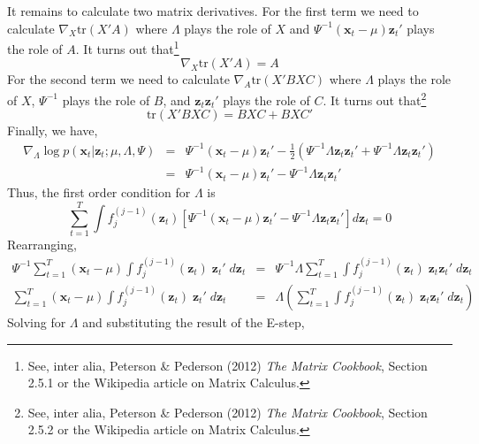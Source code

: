 \documentclass[12pt]{article}
\theoremstyle{definition}
\begin{document}
It remains to calculate two matrix derivatives. For the first term we need to calculate $\nabla_X \mbox{tr}(X'A)$ where $\Lambda$ plays the role of $X$ and $\Psi^{-1}(\mathbf{x}_t - \mu)\mathbf{z}_t'$ plays the role of $A$. It turns out that\footnote{See, inter alia, Peterson \& Pederson (2012) \emph{The Matrix Cookbook}, Section 2.5.1 or the Wikipedia article on Matrix Calculus.} 
	$$\nabla_X \mbox{tr}(X'A)  = A$$
For the second term we need to calculate $\nabla_A \mbox{tr}(X'BXC)$ where $\Lambda$ plays the role of $X$, $\Psi^{-1}$ plays the role of $B$, and $\mathbf{z}_t \mathbf{z}_t'$ plays the role of $C$. It turns out that\footnote{See, inter alia, Peterson \& Pederson (2012) \emph{The Matrix Cookbook}, Section 2.5.2 or the Wikipedia article on Matrix Calculus.}
	$$\mbox{tr}(X'BXC) = BXC + BXC'$$
Finally, we have,
	\begin{eqnarray*}
		\nabla_\Lambda \log p(\textbf{x}_t| \textbf{z}_t;\mu, \Lambda, \Psi) &=& \Psi^{-1} (\textbf{x}_t - \mu)\textbf{z}_t' - \frac{1}{2} \left(\Psi^{-1}\Lambda \textbf{z}_t \textbf{z}_t' +  \Psi^{-1}\Lambda \textbf{z}_t \textbf{z}_t'\right)\\
		&=&\Psi^{-1} (\textbf{x}_t - \mu)\textbf{z}_t' - \Psi^{-1}\Lambda \textbf{z}_t \textbf{z}_t' 
	\end{eqnarray*}
Thus, the first order condition for $\Lambda$ is
$$\sum_{t = 1}^T \int f_j^{(j-1)}(\mathbf{z}_t) \left[ \Psi^{-1} (\textbf{x}_t - \mu)\textbf{z}_t' - \Psi^{-1}\Lambda \textbf{z}_t \textbf{z}_t' \right] d \mathbf{z}_t = 0$$
Rearranging,
	\begin{eqnarray*}
		 \Psi^{-1} \sum_{t = 1}^T  (\textbf{x}_t - \mu)\int f_j^{(j-1)}(\mathbf{z}_t) \; \textbf{z}_t' \; d \mathbf{z}_t &=&  \Psi^{-1} \Lambda \sum_{t=1}^T \int f_j^{(j-1)}(\mathbf{z}_t)\; \textbf{z}_t \textbf{z}_t' \; d \mathbf{z}_t\\
		  \sum_{t = 1}^T  (\textbf{x}_t - \mu)\int f_j^{(j-1)}(\mathbf{z}_t) \; \textbf{z}_t' \; d \mathbf{z}_t &=& \Lambda \left(\sum_{t=1}^T \int f_j^{(j-1)}(\mathbf{z}_t)\; \textbf{z}_t \textbf{z}_t' \; d \mathbf{z}_t\right)
	\end{eqnarray*}
Solving for $\Lambda$ and substituting the result of the E-step,
\end{document}
